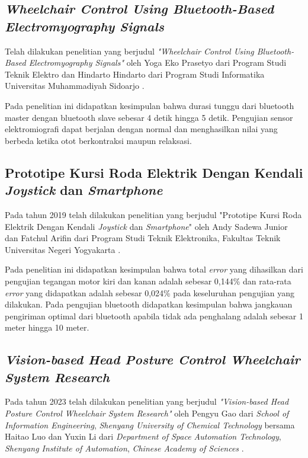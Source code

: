 \subsection{\emph{Wheelchair Control Using Bluetooth-Based Electromyography Signals}}

Telah dilakukan penelitian yang berjudul \emph{"Wheelchair Control Using Bluetooth-Based Electromyography Signals"} oleh Yoga Eko Prasetyo dari Program Studi Teknik Elektro dan Hindarto Hindarto dari Program Studi Informatika Universitas Muhammadiyah Sidoarjo \parencite{prasetyo2023wheelchair}.

Pada penelitian ini didapatkan kesimpulan bahwa durasi tunggu dari bluetooth master dengan bluetooth slave sebesar 4 detik hingga 5 detik. Pengujian sensor elektromiografi dapat berjalan dengan normal dan menghasilkan nilai yang berbeda ketika otot berkontraksi maupun relaksasi. 

\subsection{Prototipe Kursi Roda Elektrik Dengan Kendali \emph{Joystick} dan \emph{Smartphone}}

Pada tahun 2019 telah dilakukan penelitian yang berjudul "Prototipe Kursi Roda Elektrik Dengan Kendali \emph{Joystick} dan \emph{Smartphone}" oleh Andy Sadewa Junior dan Fatchul Arifin dari Program Studi Teknik Elektronika, Fakultas Teknik Universitas Negeri Yogyakarta \parencite{junior2019prototipe}.

Pada penelitian ini didapatkan kesimpulan bahwa total \emph{error} yang dihasilkan dari pengujian tegangan motor kiri dan kanan adalah sebesar 0,144\% dan rata-rata \emph{error} yang didapatkan adalah sebesar 0,024\% pada keseluruhan pengujian yang dilakukan. Pada pengujian bluetooth didapatkan kesimpulan bahwa jangkauan pengiriman optimal dari bluetooth apabila tidak ada penghalang adalah sebesar 1 meter hingga 10 meter.

\subsection{\emph{Vision-based Head Posture Control Wheelchair System Research}}

Pada tahun 2023 telah dilakukan penelitian yang berjudul \emph{"Vision-based Head Posture Control Wheelchair System Research"} oleh Pengyu Gao dari \emph{School of Information Engineering}, \emph{Shenyang University of Chemical Technology} bersama Haitao Luo dan Yuxin Li dari \emph{Department of Space Automation Technology}, \emph{Shenyang Institute of Automation}, \emph{Chinese Academy of Sciences} \parencite{10280784}.

